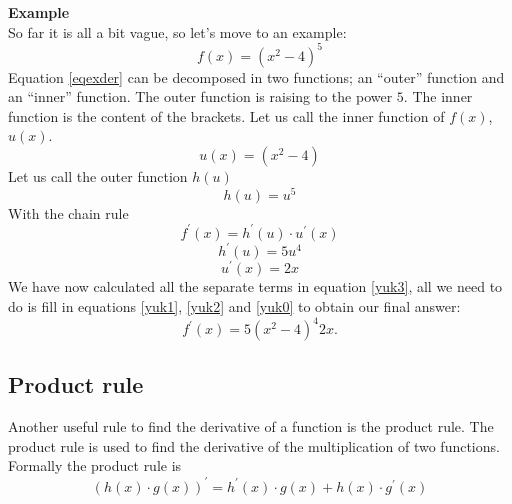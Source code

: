 \documentclass[a4paper]{report}
\begin{document}
\begin{mdframed}[backgroundcolor=exampcol]
\textbf{Example}\\
So far it is all a bit vague, so let's move to an example:
\begin{equation}
f(x)=(x^2-4)^5
\label{eqexder}
\end{equation}
Equation \ref{eqexder} can be decomposed in two functions; an ``outer'' function and an ``inner'' function. The outer function is raising to the power $5$. The inner function is the content of the brackets. Let us call the inner function of $f(x)$, $u(x)$. 
\begin{equation}
u(x)=(x^2-4)
\label{yuk0}
\end{equation}
Let us call the outer function $h(u)$
\begin{equation}
h(u)=u^5
\end{equation}
With the chain rule
\begin{equation}
f^\prime(x)=h^\prime(u)\cdot u^\prime(x)
\label{yuk3}
\end{equation}
\begin{equation}
h^\prime(u)=5u^4
\label{yuk1}
\end{equation}
\begin{equation}
u^\prime(x)=2x
\label{yuk2}
\end{equation}
We have now calculated all the separate terms in equation \ref{yuk3}, all we need to do is fill in equations \ref{yuk1}, \ref{yuk2} and \ref{yuk0} to obtain our final answer:
\begin{equation}
f^\prime(x)=5(x^2-4)^4 2x.
\end{equation}
\end{mdframed}

\subsection{Product rule}
Another useful rule to find the derivative of a function is the product rule. The product rule is used to find the derivative of the multiplication of two functions. Formally the product rule is 
\begin{equation}
(h(x)\cdot g(x))^\prime=h^\prime(x)\cdot g(x)+h(x)\cdot g^\prime(x)
\end{equation}
\end{document}
